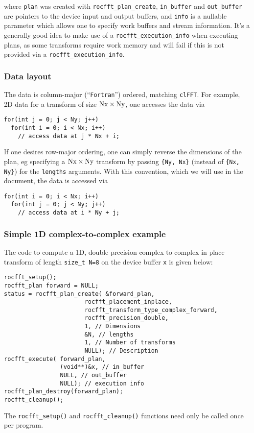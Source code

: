 \documentclass[10pt]{article}
\renewcommand{\(}{\left(}
\renewcommand{\)}{\right)}
\begin{document}
where \lstinline{plan} was created with
\lstinline{rocfft_plan_create}, \lstinline{in_buffer} and
\lstinline{out_buffer} are pointers to the device input and output
buffers, and \lstinline{info} is a nullable parameter which allows one
to specify work buffers and stream information.  It's a generally good
idea to make use of a \lstinline{rocfft_execution_info} when executing
plans, as some transforms require work memory and will fail if this is
not provided via a \lstinline{rocfft_execution_info}.

\subsubsection{Data layout}
\label{ssdatalayout}
The data is column-major (``\texttt{Fortran}'') ordered, matching
\texttt{clFFT}.  For example, 2D data for a transform of size
$\text{\lstinline{Nx}}\times\text{\lstinline{Ny}}$, one accesses the
data via
\begin{lstlisting}
for(int j = 0; j < Ny; j++)
  for(int i = 0; i < Nx; i++)
    // access data at j * Nx + i;
\end{lstlisting}
If one desires row-major ordering, one can simply reverse the
dimensions of the plan, eg specifying a
$\text{\lstinline{Nx}}\times\text{\lstinline{Ny}}$ transform by
passing \lstinline|{Ny, Nx}| (instead of \lstinline|{Nx, Ny}|) for the
\lstinline|lengths| arguments.  With this convention, which we will
use in the document, the data is accessed via 
\begin{lstlisting}
for(int i = 0; i < Nx; i++)
  for(int j = 0; j < Ny; j++)
    // access data at i * Ny + j;
\end{lstlisting}

\subsubsection{Simple 1D complex-to-complex example}
The code to compute a 1D, double-precision complex-to-complex in-place
transform of length \lstinline{size_t N=8} on the device buffer
\lstinline{x} is given below:
\begin{lstlisting}
rocfft_setup();
rocfft_plan forward = NULL;
status = rocfft_plan_create( &forward_plan,
                       rocfft_placement_inplace,
                       rocfft_transform_type_complex_forward,
                       rocfft_precision_double,
                       1, // Dimensions
                       &N, // lengths
                       1, // Number of transforms
                       NULL); // Description
rocfft_execute( forward_plan,
                (void**)&x, // in_buffer
                NULL, // out_buffer
                NULL); // execution info
rocfft_plan_destroy(forward_plan);
rocfft_cleanup();
\end{lstlisting}
The \lstinline{rocfft_setup()} and \lstinline{rocfft_cleanup()}
functions need only be called once per program.
\end{document}
